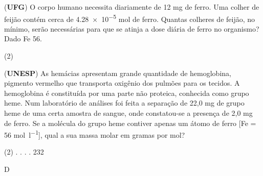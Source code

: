 \documentclass[11pt]{scrartcl}
\author{fabio}
\date{\today}
\title{}
\def\disciplina{UC3}
\begin{document}
\twocolumn[

%
%




%

\smallbreak
\medbreak
\par\vspace{2ex}]%




\begin{exercise}[points=1]
(\textbf{UFG}) O corpo humano necessita diariamente de 12 mg de ferro. Uma colher de feijão contém cerca de \num{4.28e-5} mol de ferro. Quantas colheres de feijão, no mínimo, serão necessárias para que se atinja a dose diária de ferro no organismo? Dado Fe 56.

\begin{choice}(2)
\end{choice}
\end{exercise}


\begin{exercise}[points=1]
(\textbf{UNESP}) As hemácias apresentam grande quantidade de hemoglobina, pigmento vermelho que transporta oxigênio dos pulmões para os tecidos. A hemoglobina é constituída por uma parte não proteica, conhecida como grupo heme. Num laboratório de análises foi feita a separação de 22,0 mg de grupo heme de uma certa amostra de sangue, onde constatou-se a presença de 2,0 mg de ferro.
Se a molécula do grupo heme contiver apenas um átomo de ferro [Fe = 56 \unit{\mol\per\litre}], qual a sua massa molar em gramas por mol?


\begin{choice}(2)
.
.
.
.
 232
\end{choice}
\end{exercise}
\begin{solution}
D
\end{solution}
\end{document}
